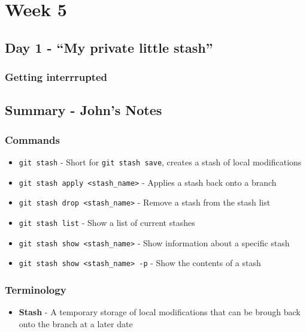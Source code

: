 \cleardoublepage
\chapter{Week 5}

\section{Day 1 - ``My private little stash''}
\subsection{Getting interrrupted}



\clearpage

\section{Summary - John's Notes}
\subsection{Commands}
\begin{itemize}

\item\texttt{git stash} - Short for \texttt{git stash save}, creates a stash of local modifications

\item\texttt{git stash apply <stash\_name>} - Applies a stash back onto a branch

\item\texttt{git stash drop <stash\_name>} - Remove a stash from the stash list

\item\texttt{git stash list} - Show a list of current stashes

\item\texttt{git stash show <stash\_name>} - Show information about a specific stash

\item\texttt{git stash show <stash\_name> -p} - Show the contents of a stash

\end{itemize}

\subsection{Terminology}
\begin{itemize}
\item\textbf{Stash} - A temporary storage of local modifications that can be brough back onto the branch at a later date
\end{itemize}
